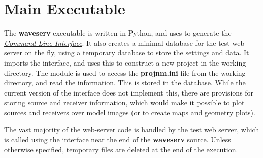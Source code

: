 \documentclass[letterpaper,10pt,english]{sphinxmanual}
\begin{document}
\section{Main Executable}
\label{development:main-executable}
The \textbf{waveserv} executable is written in Python, and uses \href{http://docs.python.org/library/optparse.html\#optparse}{} to generate the {\hyperref[cli:cli]{\emph{Command Line Interface}}}.  It also creates a minimal database for the  test web server on the fly, using a temporary \href{http://docs.python.org/library/sqlite3.html\#sqlite3}{} database to store the settings and data.  It imports the  interface, and uses this to construct a new  project in the working directory.  The  module is used to access the \textbf{projnm.ini} file from the working directory, and read the information.  This is stored in the  database.  While the current version of the interface does not implement this, there are provisions for storing source and receiver information, which would make it possible to plot sources and receivers over model images (or to create maps and geometry plots).

The vast majority of the web-server code is handled by the  test web server, which is called using the  interface near the end of the \textbf{waveserv} source.  Unless otherwise specified, temporary files are deleted at the end of the execution.
\end{document}
